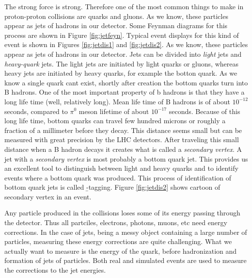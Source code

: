 The strong force is strong.  Therefore one of the most common things to make in proton-proton collisions are quarks and gluons.  As we know, these particles appear as jets of hadrons in our detector.  Some Feynman diagrams for this process are shown in Figure \ref{fig:jetfeyn}.  Typical event displays for this kind of event is shown in Figures \ref{fig:jetdis1} and \ref{fig:jetdis2}.  As we know, these particles appear as jets of hadrons in our detector.  Jets can be divided  into   {\it light} jets   and  {\it heavy-quark}  jets.  The light jets are initiated by light quarks or gluons, whereas heavy jets are initiated by heavy quarks, for example the botton quark.    As we know a single quark cant exist, shortly after creation the bottom quarks turn into B hadrons. One of the most important property of b hadrons is that they have a long life time (well, relatively long).  Mean life time of B hadrons is of about  $10^{-12}$ seconds, compared to $\pi^0$ meson lifetime of about $10^{-17}$ seconds. Because of this long life time, bottom quarks   can travel  few hundred microns or roughly a fraction of a millimeter before they decay. This distance seems small but can be measured with great precision by the LHC detectors. After traveling this small distance when a B hadron decays it creates what is called   a {\it secondary vertex}.  A jet with a {\it secondary vertex} is most probably a  bottom quark jet. This provides us an excellent tool to distinguish between light and heavy quarks and to identify events where a bottom quark was produced. This process of identification of bottom quark jets is called {\b-tagging}. Figure \ref{fig:jetdis2}  shows cartoon of  secondary vertex in an event.
 

Any particle produced in the collisions loses some of its energy passing through the detector. Thus all partciles, electrons, photons, muons, etc need energy corrections. In the case of jets, being a messy object containing a large number of particles, measuring these energy corrections are quite challenging.  What we actually want to measure is the energy of the quark, before hadronization and formation of jets of particles.  Both real and simulated events are used to measure the corrections to the jet energies.


